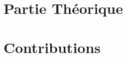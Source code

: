 \documentclass[12pt, francais, doublespacing, headsepline,oneside]{MastersDoctoralThesis}
\begin{document}
\newpage
\dominitoc
\mainmatter %
\begin{abstract}
\addchaptertocentry{\abstractname} %

\end{abstract}


\tableofcontents
\tableofcontents
\listoffigures
\listoftables


\pagestyle{thesis} %

\newtheorem{mydef}{Definition}
\newtheorem{theoreme}{Theorème}    
\newtheorem{mylemma}{Lemma}     

\adjustmtc

\adjustmtc
\adjustmtc
\part{Partie Théorique}


\part{Contributions}



\printbibliography[heading=bibintoc]
\end{document}
